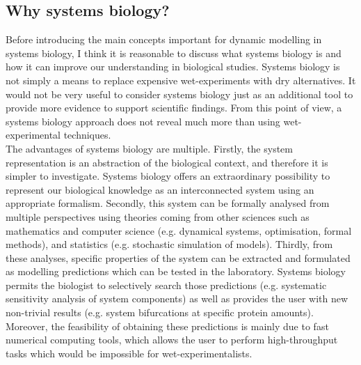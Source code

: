 \subsection{Why systems biology?}
\label{subsec:Why systems biology?}
Before introducing the main concepts important for dynamic modelling in systems biology, I think it is reasonable to discuss what systems biology is and how it can improve our understanding in biological studies. Systems biology is not simply a means to replace expensive wet-experiments with dry alternatives. It would not be very useful to consider systems biology just as an additional tool to provide more evidence to support scientific findings. From this point of view, a systems biology approach does not reveal much more than using wet-experimental techniques.\\ 
The advantages of systems biology are multiple. Firstly, the system representation is an abstraction of the biological context, and therefore it is simpler to investigate. Systems biology offers an extraordinary possibility to represent our biological knowledge as an interconnected system using an appropriate formalism. Secondly, this system can be formally analysed from multiple perspectives using theories coming from other sciences such as mathematics and computer science (e.g. dynamical systems, optimisation, formal methods), and statistics (e.g. stochastic simulation of models). Thirdly, from these analyses, specific properties of the system can be extracted and formulated as modelling predictions which can be tested in the laboratory. Systems biology permits the biologist to selectively search those predictions (e.g. systematic sensitivity analysis of system components) as well as provides the user with new non-trivial results (e.g. system bifurcations at specific protein amounts). Moreover, the 
feasibility of obtaining these predictions is mainly due to fast numerical computing tools, which allows the user to perform high-throughput tasks which would be impossible for wet-experimentalists. 


